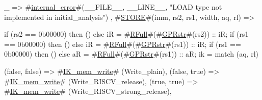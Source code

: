 {{{{                 _  => #\hyperref[sailRISCVzinternalzyerror]{internal\_error}#(__FILE__, __LINE__, "LOAD type not implemented in initial_analysis")
               }
      },
      #\hyperref[sailRISCVzSTORE]{STORE}#(imm, rs2, rs1, width, aq, rl) => {
             if (rs2 == 0b00000) then () else iR = #\hyperref[sailRISCVzRFull]{RFull}#(#\hyperref[sailRISCVzGPRstr]{GPRstr}#(rs2)) :: iR;
             if (rs1 == 0b00000) then () else iR = #\hyperref[sailRISCVzRFull]{RFull}#(#\hyperref[sailRISCVzGPRstr]{GPRstr}#(rs1)) :: iR;
             if (rs1 == 0b00000) then () else aR = #\hyperref[sailRISCVzRFull]{RFull}#(#\hyperref[sailRISCVzGPRstr]{GPRstr}#(rs1)) :: aR;
             ik =
               match (aq, rl) {
                 (false, false) => #\hyperref[sailRISCVzIKzymemzywrite]{IK\_mem\_write}# (Write_plain),
                 (false, true)  => #\hyperref[sailRISCVzIKzymemzywrite]{IK\_mem\_write}# (Write_RISCV_release),
                 (true,  true)  => #\hyperref[sailRISCVzIKzymemzywrite]{IK\_mem\_write}# (Write_RISCV_strong_release),

}}}}
